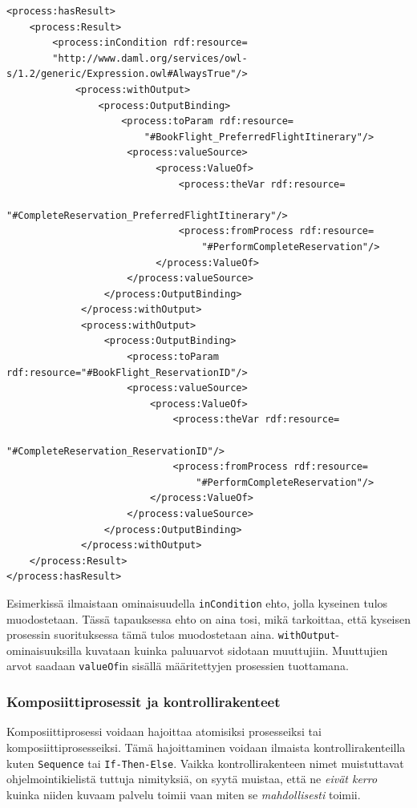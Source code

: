 \documentclass[finnish]{tktltiki2}
\theoremstyle{definition}
\theoremstyle{remark}
\begin{document}
\begin{verbatim}
<process:hasResult>
    <process:Result>
        <process:inCondition rdf:resource=
        "http://www.daml.org/services/owl-s/1.2/generic/Expression.owl#AlwaysTrue"/>
            <process:withOutput>
                <process:OutputBinding>
                    <process:toParam rdf:resource=
                        "#BookFlight_PreferredFlightItinerary"/>
                     <process:valueSource>
                          <process:ValueOf>
                              <process:theVar rdf:resource=
                                  "#CompleteReservation_PreferredFlightItinerary"/>
                              <process:fromProcess rdf:resource=
                                  "#PerformCompleteReservation"/>
                          </process:ValueOf>
                     </process:valueSource>
                 </process:OutputBinding>
             </process:withOutput>
             <process:withOutput>
                 <process:OutputBinding>
                     <process:toParam rdf:resource="#BookFlight_ReservationID"/>
                     <process:valueSource>
                         <process:ValueOf>
                             <process:theVar rdf:resource=
                                 "#CompleteReservation_ReservationID"/>
                             <process:fromProcess rdf:resource=
                                 "#PerformCompleteReservation"/>
                         </process:ValueOf>
                     </process:valueSource>
                 </process:OutputBinding>
             </process:withOutput>
    </process:Result>
</process:hasResult>
\end{verbatim}


Esimerkissä ilmaistaan ominaisuudella \texttt{inCondition} ehto, jolla kyseinen tulos muodostetaan. Tässä tapauksessa ehto on aina tosi, mikä tarkoittaa, että kyseisen prosessin suorituksessa tämä tulos muodostetaan aina. \texttt{withOutput}-ominaisuuksilla kuvataan kuinka paluuarvot sidotaan muuttujiin. Muuttujien arvot saadaan \texttt{valueOf}in sisällä määritettyjen prosessien tuottamana. 

\subsubsection{Komposiittiprosessit ja kontrollirakenteet}

Komposiittiprosessi voidaan hajoittaa atomisiksi prosesseiksi tai komposiittiprosesseiksi\cite{OWLS}. Tämä hajoittaminen voidaan ilmaista kontrollirakenteilla kuten \texttt{Sequence} tai \texttt{If-Then-Else}. Vaikka kontrollirakenteen nimet muistuttavat ohjelmointikielistä tuttuja nimityksiä, on syytä muistaa, että ne \textit{eivät kerro} kuinka niiden kuvaam palvelu toimii vaan miten se \textit{mahdollisesti} toimii\cite{OWLS}. 
\end{document}
